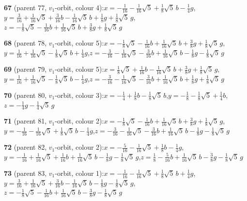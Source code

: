\documentclass[10pt]{article}
\begin{document}
{\noindent\textbf{67} (parent 77, $v_1$-orbit, colour 4):\quad $x=-\tfrac{1}{16}-\tfrac{1}{16}\sqrt5+\tfrac{1}{8}\sqrt5\,b-\tfrac{1}{4}g$,\quad $y=\tfrac{3}{16}+\tfrac{1}{16}\sqrt5+\tfrac{3}{16}b-\tfrac{1}{16}\sqrt5\,b+\tfrac{1}{8}g+\tfrac{1}{8}\sqrt5\,g$,\quad $z=-\tfrac{1}{8}\sqrt5-\tfrac{1}{16}b+\tfrac{1}{16}\sqrt5\,b+\tfrac{3}{8}g+\tfrac{1}{8}\sqrt5\,g$\par\smallskip
\noindent\textbf{68} (parent 78, $v_1$-orbit, colour 5):\quad $x=-\tfrac{1}{8}\sqrt5-\tfrac{1}{16}b+\tfrac{1}{16}\sqrt5\,b+\tfrac{3}{8}g+\tfrac{1}{8}\sqrt5\,g$,\quad $y=\tfrac{1}{16}+\tfrac{1}{16}\sqrt5-\tfrac{1}{8}\sqrt5\,b+\tfrac{1}{4}g$,\quad $z=-\tfrac{3}{16}-\tfrac{1}{16}\sqrt5-\tfrac{3}{16}b+\tfrac{1}{16}\sqrt5\,b-\tfrac{1}{8}g-\tfrac{1}{8}\sqrt5\,g$\par\smallskip
\noindent\textbf{69} (parent 79, $v_1$-orbit, colour 5):\quad $x=\tfrac{1}{8}\sqrt5+\tfrac{1}{16}b-\tfrac{1}{16}\sqrt5\,b+\tfrac{3}{8}g+\tfrac{1}{8}\sqrt5\,g$,\quad $y=\tfrac{1}{16}+\tfrac{1}{16}\sqrt5-\tfrac{1}{8}\sqrt5\,b-\tfrac{1}{4}g$,\quad $z=-\tfrac{3}{16}-\tfrac{1}{16}\sqrt5-\tfrac{3}{16}b+\tfrac{1}{16}\sqrt5\,b+\tfrac{1}{8}g+\tfrac{1}{8}\sqrt5\,g$\par\smallskip
\noindent\textbf{70} (parent 80, $v_1$-orbit, colour 3):\quad $x=-\tfrac{1}{4}+\tfrac{1}{8}b-\tfrac{1}{8}\sqrt5\,b$,\quad $y=-\tfrac{1}{8}-\tfrac{1}{8}\sqrt5+\tfrac{1}{4}b$,\quad $z=-\tfrac{1}{4}g-\tfrac{1}{4}\sqrt5\,g$\par\smallskip
\noindent\textbf{71} (parent 81, $v_1$-orbit, colour 2):\quad $x=-\tfrac{1}{8}\sqrt5-\tfrac{1}{16}b+\tfrac{1}{16}\sqrt5\,b+\tfrac{3}{8}g+\tfrac{1}{8}\sqrt5\,g$,\quad $y=-\tfrac{1}{16}-\tfrac{1}{16}\sqrt5+\tfrac{1}{8}\sqrt5\,b-\tfrac{1}{4}g$,\quad $z=-\tfrac{3}{16}-\tfrac{1}{16}\sqrt5-\tfrac{3}{16}b+\tfrac{1}{16}\sqrt5\,b-\tfrac{1}{8}g-\tfrac{1}{8}\sqrt5\,g$\par\smallskip
\noindent\textbf{72} (parent 82, $v_1$-orbit, colour 2):\quad $x=-\tfrac{5}{16}-\tfrac{1}{16}\sqrt5+\tfrac{1}{8}b-\tfrac{1}{4}g$,\quad $y=-\tfrac{1}{16}+\tfrac{1}{16}\sqrt5+\tfrac{1}{16}b+\tfrac{1}{16}\sqrt5\,b-\tfrac{1}{8}g-\tfrac{1}{8}\sqrt5\,g$,\quad $z=\tfrac{1}{8}-\tfrac{5}{16}b+\tfrac{1}{16}\sqrt5\,b-\tfrac{3}{8}g-\tfrac{1}{8}\sqrt5\,g$\par\smallskip
\noindent\textbf{73} (parent 83, $v_1$-orbit, colour 1):\quad $x=-\tfrac{1}{16}-\tfrac{1}{16}\sqrt5+\tfrac{1}{8}\sqrt5\,b+\tfrac{1}{4}g$,\quad $y=\tfrac{3}{16}+\tfrac{1}{16}\sqrt5+\tfrac{3}{16}b-\tfrac{1}{16}\sqrt5\,b-\tfrac{1}{8}g-\tfrac{1}{8}\sqrt5\,g$,\quad $z=-\tfrac{1}{8}\sqrt5-\tfrac{1}{16}b+\tfrac{1}{16}\sqrt5\,b-\tfrac{3}{8}g-\tfrac{1}{8}\sqrt5\,g$\par\smallskip
}
\end{document}
